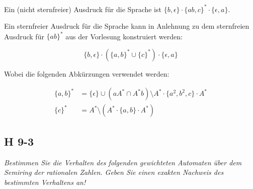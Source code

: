 \documentclass{scrartcl}
\begin{document}
\begin{enumerate}[(a)]
      Ein (nicht sternfreier) Ausdruck für die Sprache ist $\{b, \epsilon\} \cdot \{ab,c\}^* \cdot \{\epsilon, a\}$.

      Ein sternfreier Ausdruck für die Sprache kann in Anlehnung zu dem sternfreien Ausdruck für $\{ab\}^*$ aus der Vorlesung konstruiert werden:

      \begin{equation*}
        \{b, \epsilon\} \cdot (\{a,b\}^* \cup \{c\}^*) \cdot \{\epsilon, a\}
      \end{equation*}

      Wobei die folgenden Abkürzungen verwendet werden:

      \begin{align*}
        \{a,b\}^* &= \{\epsilon\} \cup (aA^* \cap A^*b) \setminus A^* \cdot \{a^2, b^2, c\} \cdot A^*\\
        \{c\}^* &= A^* \setminus (A^* \cdot \{a, b\} \cdot A^*)
      \end{align*}
\end{enumerate}

\subsection{H 9-3}

\textsl{Bestimmen Sie die Verhalten des folgenden gewichteten Automaten über dem \emph{Semiring der rationalen Zahlen}. Geben Sie einen exakten Nachweis des bestimmten Verhaltens an!}
\end{document}

